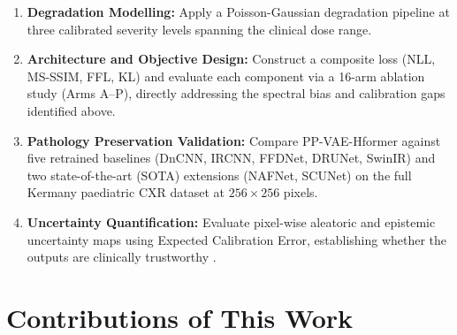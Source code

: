 \documentclass[12pt, a4paper, twoside, openright]{book}
\begin{document}
\begin{enumerate}
  \item \textbf{Degradation Modelling:} Apply a Poisson-Gaussian degradation pipeline \cite{foi_practical_2008} at three calibrated severity levels spanning the clinical dose range.

  \item \textbf{Architecture and Objective Design:} Construct a composite loss (NLL, MS-SSIM, FFL, KL) and evaluate each component via a 16-arm ablation study (Arms A--P), directly addressing the spectral bias \cite{rahaman_spectral_2019} and calibration gaps identified above.

  \item \textbf{Pathology Preservation Validation:} Compare PP-VAE-Hformer against five retrained baselines (DnCNN, IRCNN, FFDNet, DRUNet, SwinIR) and two state-of-the-art (SOTA) extensions (NAFNet, SCUNet) on the full Kermany paediatric CXR dataset \cite{kermany_identifying_2018} at $256\times256$ pixels.

  \item \textbf{Uncertainty Quantification:} Evaluate pixel-wise aleatoric and epistemic uncertainty maps using Expected Calibration Error, establishing whether the outputs are clinically trustworthy \cite{kendall_what_2017}.
\end{enumerate}

\section{Contributions of This Work}
\label{sec:intro:contributions}
\end{document}
